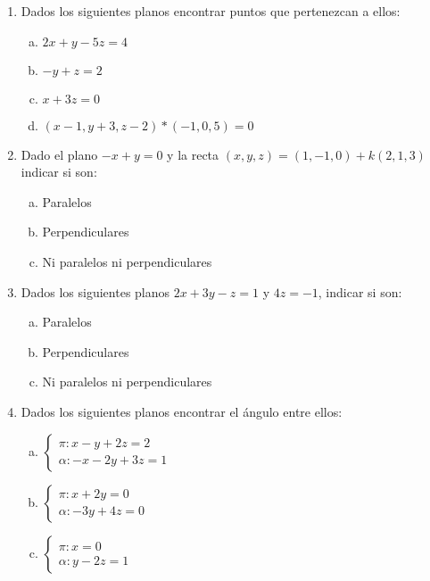 \documentclass[11pt,a4paper]{article}
\begin{document}
\begin{enumerate}
\item Dados los siguientes planos encontrar puntos que pertenezcan a ellos:

\begin{enumerate}[a)]
\item $2x + y - 5z = 4$
\item $-y + z = 2$
\item $x + 3z = 0$
\item $(x - 1, y + 3, z - 2) * (-1, 0 , 5) = 0$
\end{enumerate}

\item Dado el plano $-x + y = 0$ y la recta $(x, y, z) = (1, -1, 0) + k (2, 1, 3)$ indicar si son:

\begin{enumerate}[a)]
\item Paralelos
\item Perpendiculares
\item Ni paralelos ni perpendiculares
\end{enumerate}

\item Dados los siguientes planos $2x + 3y - z = 1$ y $4z = -1$, indicar si son:

\begin{enumerate}[a)]
\item Paralelos
\item Perpendiculares
\item Ni paralelos ni perpendiculares
\end{enumerate}

\item Dados los siguientes planos encontrar el \'angulo entre ellos:

\begin{enumerate}[a)]
\item $\begin{cases}
  \pi \colon x - y + 2z = 2 \\
  \alpha \colon -x - 2y + 3z = 1
\end{cases}$
\item $\begin{cases}
  \pi \colon x + 2y  = 0 \\
  \alpha \colon -3y + 4z = 0
\end{cases}$  
\item $\begin{cases}
  \pi \colon x = 0 \\
  \alpha \colon y - 2z = 1
\end{cases}$
\end{enumerate}


\end{enumerate}
\end{document}
